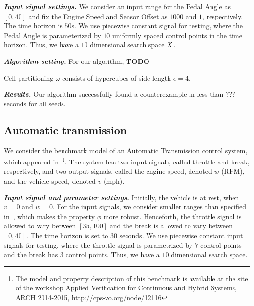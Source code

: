 \emph{\textbf{Input signal settings.}}
We consider an input range for
the Pedal Angle as $[0,40]$ and fix the Engine Speed and
Sensor Offset as $1000$ and $1$, respectively. The time horizon is $50$s.  We use piecewise constant
signal for testing, where the Pedal Angle is parameterized by $10$
uniformly spaced control points in the time horizon.  Thus, we
have a $10$ dimensional search space $X$.%

\emph{\textbf {Algorithm setting.}}  For our algorithm, {\bf TODO}


Cell partitioning $\omega$
consists of hypercubes of side length $\epsilon=4$. 

 \emph{\textbf {Results.}} Our algorithm successfully found a counterexample in less
than ??? seconds for all seeds. 



\subsection{Automatic transmission} \label{sec:autotrans}
We consider the benchmark model of an Automatic Transmission control
system, which appeared in~\cite{FainekosARCH1415}\footnote{The model
and property description of this benchmark is available at the site of
the workshop Applied Verification for Continuous and Hybrid Systems,
ARCH 2014-2015, \url{http://cps-vo.org/node/12116}}.  The system has
two input signals, called throttle and break, respectively, and two
output signals, called the engine speed, denoted $w$ (RPM), and the vehicle
speed, denoted $v$ (mph).%


\emph{\textbf{Input signal and parameter settings.}}
Initially, the vehicle is at rest, when $v=0$ and $w=0$.  For the
input signals, we consider smaller ranges than specified
in~\cite{FainekosARCH1415}, which makes the property $\phi$ more
robust.  Henceforth, the throttle signal is allowed to vary between
$[35,100]$ and the break is allowed to vary between $[0,40]$.  The
time horizon is set to $30$ seconds.  We use piecewise constant input
signals for testing, where the throttle signal is parametrized by $7$
control points and the break has $3$ control points. Thus, we have a
$10$ dimensional search space.


